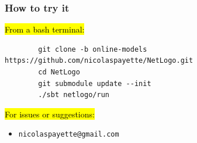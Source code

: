\documentclass{beamer}
\begin{document}
\begin{frame}[fragile]\frametitle{How to try it}
  \begin{adjustwidth}{-6mm}{0mm}
    \hl{\larger From a bash terminal:}
    \vspace{1em}
    \begin{adjustwidth}{-12mm}{0mm}\footnotesize
      \begin{verbatim}
        git clone -b online-models https://github.com/nicolaspayette/NetLogo.git
        cd NetLogo
        git submodule update --init
        ./sbt netlogo/run
      \end{verbatim}
    \end{adjustwidth}
    \vspace{2em}
    \hl{\larger For issues or suggestions:}

    \begin{itemize}
      \item \texttt{nicolaspayette@gmail.com}
    \end{itemize}

  \end{adjustwidth}
\end{frame}
\end{document}
